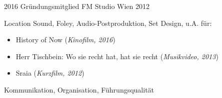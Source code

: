 \begin{experiences}
	\emptySeparator

	\experience
	{2016}
	{Gründungsmitglied}
	{FM Studio}
	{Wien}
	{2012}
	{
		Location Sound, Foley, Audio-Postproduktion, Set Design, u.A. für:
		\begin{itemize}
			\item History of Now
			      (\textit{Kinofilm, 2016})
			\item Herr Tischbein: Wo sie recht hat, hat sie recht
			      (\textit{Musikvideo, 2013})
			\item Sraia
			      (\textit{Kurzfilm, 2012})
		\end{itemize}
	}
	{Kommunikation, Organisation, Führungsqualität}
\end{experiences}